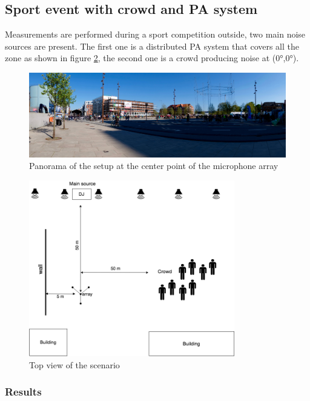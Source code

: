 \newpage
\subsection{Sport event with crowd and PA system }

Measurements are performed during a sport competition outside, two main noise sources are present. The first one is a distributed PA system that covers all the zone as shown in figure \ref{fig:Scenario1diagram}, the second one is a crowd producing noise at (0°,0°).

\begin{figure}[H]
    \centering
    \includegraphics[width=1\textwidth]{Figures/bmxracepic.jpg}
    \caption{Panorama of the setup at the center point of the microphone array}
    \label{fig:Scenario3}
\end{figure}

\begin{figure}[H]
    \centering
    \includegraphics[width=0.8\textwidth]{Figures/bmxrace1.png}
    \caption{Top view of the scenario}
    \label{fig:Scenario1diagram}
\end{figure}

\subsubsection{Results}

